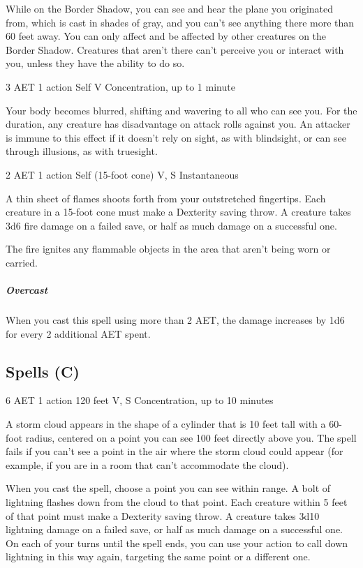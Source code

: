 While on the Border Shadow, you can see and hear the plane you originated from, which is cast in shades of gray, and you can't see anything there more than 60 feet away. You can only affect and be affected by other creatures on the Border Shadow. Creatures that aren't there can't perceive you or interact with you, unless they have the ability to do so.


{3 AET}
{1 action}
{Self}
{V}
{Concentration, up to 1 minute}

Your body becomes blurred, shifting and wavering to all who can see you. For the duration, any creature has disadvantage on attack rolls against you. An attacker is immune to this effect if it doesn't rely on sight, as with blindsight, or can see through illusions, as with truesight.


{2 AET}
{1 action}
{Self (15-foot cone)}
{V, S}
{Instantaneous}

A thin sheet of flames shoots forth from your outstretched fingertips. Each creature in a 15-foot cone must make a Dexterity saving throw. A creature takes 3d6 fire damage on a failed save, or half as much damage on a successful one.

The fire ignites any flammable objects in the area that aren't being worn or carried.

\subparagraph*{Overcast} When you cast this spell using more than 2 AET, the damage increases by 1d6 for every 2 additional AET spent.

\subsection{Spells (C)}


{6 AET}
{1 action}
{120 feet}
{V, S}
{Concentration, up to 10 minutes}

A storm cloud appears in the shape of a cylinder that is 10 feet tall with a 60-foot radius, centered on a point you can see 100 feet directly above you. The spell fails if you can't see a point in the air where the storm cloud could appear (for example, if you are in a room that can't accommodate the cloud).

When you cast the spell, choose a point you can see within range. A bolt of lightning flashes down from the cloud to that point. Each creature within 5 feet of that point must make a Dexterity saving throw. A creature takes 3d10 lightning damage on a failed save, or half as much damage on a successful one. On each of your turns until the spell ends, you can use your action to call down lightning in this way again, targeting the same point or a different one.

